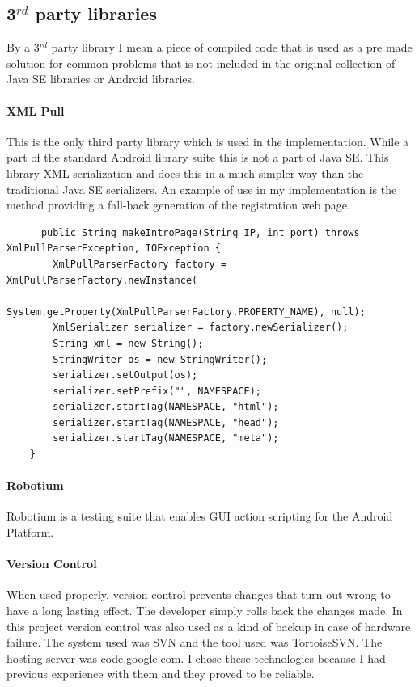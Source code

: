 \documentclass[11pt,twoside,a4paper]{book}
\begin{document}
\subsection{3$^{rd}$ party libraries}
By a  3$^{rd}$ party library I mean a piece of compiled code that is used as a pre made solution for common problems that  is not included in the original collection of Java SE libraries or Android libraries.
\paragraph{XML Pull\cite{xmlpull}}
This is the only third party library which is used in the implementation. While a part of the standard Android library suite this is not a part of Java SE. This library XML serialization and does this in a much simpler way than the traditional Java SE serializers. An example of use in my implementation is the method providing a fall-back generation of the registration web page.\\
\begin{lstlisting}
      public String makeIntroPage(String IP, int port) throws XmlPullParserException, IOException {
        XmlPullParserFactory factory = XmlPullParserFactory.newInstance(
                System.getProperty(XmlPullParserFactory.PROPERTY_NAME), null);
        XmlSerializer serializer = factory.newSerializer();
        String xml = new String();
        StringWriter os = new StringWriter();
        serializer.setOutput(os);
        serializer.setPrefix("", NAMESPACE);
        serializer.startTag(NAMESPACE, "html");
        serializer.startTag(NAMESPACE, "head");
        serializer.startTag(NAMESPACE, "meta");
	}
\end{lstlisting}

\paragraph{Robotium\cite{robotium}}
Robotium is a testing suite that enables GUI action scripting for the Android Platform. 

\paragraph{Version Control}
When used properly, version control prevents changes that turn out wrong to have a long lasting effect. The developer simply rolls back the changes made. In this project version control was also used as a kind of backup in case of hardware failure. The system used was SVN and the tool used was TortoiseSVN. The hosting server was code.google.com. I chose these technologies because I had previous experience with them and they proved to be reliable.	 
\end{document}

